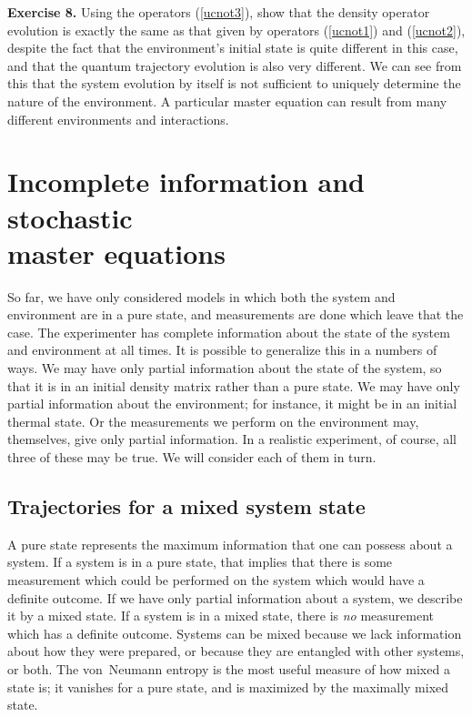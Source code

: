 \documentclass[12pt]{article}
\begin{document}
\medskip\noindent
{\bf Exercise 8.}  Using the operators (\ref{ucnot3}), show that the
density operator evolution is exactly the same as that given by operators
(\ref{ucnot1}) and (\ref{ucnot2}), despite the fact that the environment's
initial state is quite different in this case, and that the quantum
trajectory evolution is also very different.  We can see from this that
the system evolution by itself is not sufficient to uniquely determine the
nature of the environment.  A particular master equation can result from
many different environments and interactions.
\medskip

\section{Incomplete information and stochastic \\ master equations}

So far, we have only considered models in which both the system and
environment are in a pure state, and measurements
are done which leave that the case.
The experimenter has complete information
about the state of the system and environment at all times.
It is possible to generalize this in a numbers of ways.  We may have only
partial information about the state of the system, so that it is in an
initial density matrix rather than a pure state.  We may have only partial
information about the environment; for instance, it might be in an initial
thermal state.  Or the measurements we perform on the environment may,
themselves, give only partial information.  In a realistic experiment,
of course, all three of these may be true.  We will consider each of
them in turn.

\subsection{Trajectories for a mixed system state}

A pure state represents the maximum information that one can possess about
a system.  If a system is in a pure state, that implies that there is
some measurement which could be performed on the system which would have
a definite outcome.  If we have only partial information about a system,
we describe it by a mixed state.  If a system is in a mixed state, there
is {\it no} measurement which has a definite outcome.  Systems can be
mixed because we lack information about how they were prepared, or because
they are entangled with other systems, or both.  The von~Neumann entropy
is the most useful measure of how mixed a state is; it vanishes for a
pure state, and is maximized by the maximally mixed state.
\end{document}
